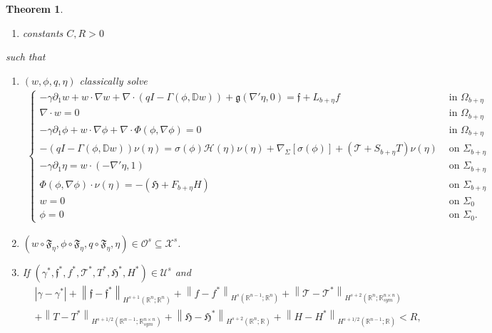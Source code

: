 \documentclass[11pt,letterpaper,reqno]{amsart}
\newtheorem{theorem}{Theorem}[section]
\numberwithin{equation}{section}
\newcommand{\abs}[1]{\left\lvert#1\right\rvert}
\newcommand{\norm}[1]{\left\lVert#1\right\rVert}
\begin{document}
\begin{theorem}
\begin{enumerate}
        \item constants \(C,R>0\)
    \end{enumerate}
    such that
    \begin{enumerate}
        \item \((w,\phi,q,\eta)\) classically solve
        \begin{align} \label{sysori}
            \begin{cases}
                -\gamma\partial_{1}w+w \cdot \nabla w + \nabla \cdot(qI-\Gamma(\phi,\mathbb{D}w))+\mathfrak{g}(\nabla'\eta,0) = \mathfrak{f}+L_{b+\eta}f &\mbox{ in \(\Omega_{b+\eta}\)} \\
                \nabla \cdot w = 0 &\mbox{ in \(\Omega_{b+\eta}\)} \\
                -\gamma\partial_{1}\phi+ w \cdot \nabla \phi +\nabla \cdot \Phi(\phi,\nabla \phi) = 0 &\mbox{ in \(\Omega_{b+\eta}\)} \\
                -(qI-\Gamma(\phi,\mathbb{D}w))\nu(\eta) = \sigma(\phi)\mathcal{H}(\eta)\nu(\eta) + \nabla_{\Sigma}[\sigma(\phi)]+(\mathcal{T}+S_{b+\eta}T)\nu(\eta) &\mbox{ on \(\Sigma_{b+\eta}\)} \\
                -\gamma\partial_{1}\eta = w \cdot (-\nabla ' \eta,1) &\mbox{ on \(\Sigma_{b+\eta}\)} \\
                \Phi(\phi,\nabla\phi)\cdot \nu(\eta) = -(\mathfrak{H}+F_{b+\eta}H) &\mbox{ on \(\Sigma_{b+\eta}\)} \\
                w = 0 &\mbox{ on \(\Sigma_{0}\)} \\
                \phi = 0 &\mbox{ on \(\Sigma_{0}\)}.
            \end{cases}
        \end{align}
        \item \((w \circ \mathfrak{F}_{\eta}, \phi \circ \mathfrak{F}_{\eta}, q \circ \mathfrak{F}_{\eta}, \eta)\in \mathcal{O}^{s} \subseteq \mathcal{X}^{s}\).
        \item If \((\gamma^{*},\mathfrak{f}^{*},f^{*}, \mathcal{T}^{*},T^{*},\mathfrak{H}^{*},H^{*}) \in \mathcal{U}^{s}\) and
        \begin{align}
            &\abs{\gamma-\gamma^{*}}+\norm{\mathfrak{f}-\mathfrak{f}^{*}}_{H^{s+1}(\mathbb{R}^{n};\mathbb{R}^{n})}+\norm{f-f^{*}}_{H^{s}(\mathbb{R}^{n-1};\mathbb{R}^{n})}+\norm{\mathcal{T}-\mathcal{T}^{*}}_{H^{s+2}(\mathbb{R}^{n};\mathbb{R}_{sym}^{n\times n})} \nonumber \\
            &+\norm{T-T^{*}}_{H^{s+1/2}(\mathbb{R}^{n-1};\mathbb{R}_{sym}^{n \times n})}+\norm{\mathfrak{H}-\mathfrak{H}^{*}}_{H^{s+2}(\mathbb{R}^{n};\mathbb{R})}+\norm{H-H^{*}}_{H^{s+1/2}(\mathbb{R}^{n-1};\mathbb{R})}<R,

\end{align}
\end{enumerate}
\end{theorem}
\end{document}
